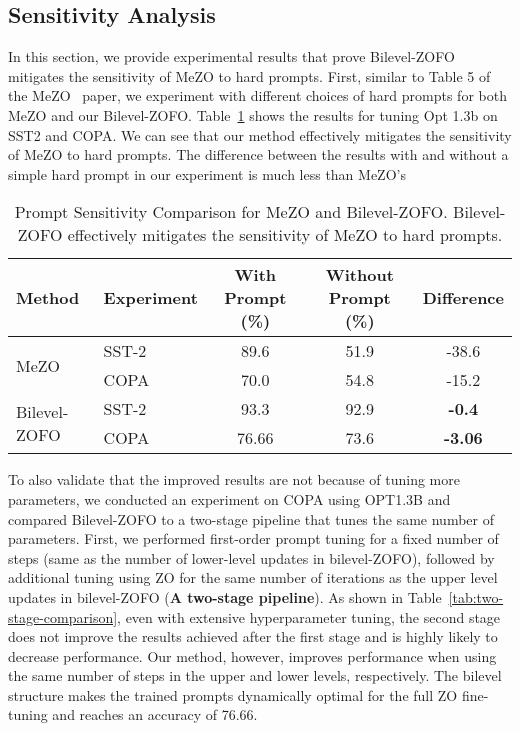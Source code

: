 \subsection{Sensitivity Analysis}\label{sec:sensitivity-analysis}
In this section, we provide experimental results that prove Bilevel-ZOFO mitigates the sensitivity of MeZO to hard prompts. First, similar to Table 5 of the MeZO~\cite{MalladiGNDL0A23Mezo} paper, we experiment with different choices of hard prompts for both MeZO and our Bilevel-ZOFO. Table~\ref{tab:prompt_sensitivity_comparison-app} shows the results for tuning Opt 1.3b on SST2 and COPA. We can see that our method effectively mitigates the sensitivity of MeZO to hard prompts. The difference between the results with and without a simple hard prompt in our experiment is much less than MeZO's


\begin{table}
\centering
\begin{tabular}{llccc}
\hline
\textbf{Method}         & \textbf{Experiment} & \textbf{With Prompt (\%)} & \textbf{Without Prompt (\%)} & \textbf{Difference} \\ \hline
\multirow{2}{*}{MeZO}   & SST-2               & 89.6                      & 51.9                        & -38.6               \\ 
                        & COPA                & 70.0                      & 54.8                        & -15.2               \\ \hline
\multirow{2}{*}{Bilevel-ZOFO} & SST-2         & 93.3                      & 92.9                        & \textbf{-0.4}                \\ 
                        & COPA                & 76.66                     & 73.6                        & \textbf{-3.06}               \\ \hline
\end{tabular}
\caption{Prompt Sensitivity Comparison for MeZO and Bilevel-ZOFO. Bilevel-ZOFO effectively mitigates the sensitivity of MeZO to hard prompts.}
\label{tab:prompt_sensitivity_comparison-app}
\end{table}

To also validate that the improved results are not because of tuning more parameters, we conducted an experiment on COPA using OPT1.3B  and compared Bilevel-ZOFO to a two-stage pipeline that tunes the same number of parameters. First, we performed first-order prompt tuning for a fixed number of steps (same as the number of lower-level updates in bilevel-ZOFO), followed by additional tuning using ZO for the same number of iterations as the upper level updates in bilevel-ZOFO (\textbf{A two-stage pipeline}). As shown in Table~\ref{tab:two-stage-comparison}, even with extensive hyperparameter tuning, the second stage does not improve the results achieved after the first stage and is highly likely to decrease performance. Our method, however, improves performance when using the same number of steps in the upper and lower levels, respectively. The bilevel structure makes the trained prompts dynamically optimal for the full ZO fine-tuning and reaches an accuracy of 76.66.


